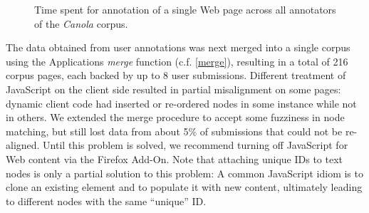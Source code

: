 \begin{figure}[h]
\centering
{}
\caption{
\label{f:userstats}
\label{ens1}
	Time spent for annotation of a single Web page across all annotators of the \textit{Canola} corpus.}
\end{figure}

The data obtained from user annotations was next merged into a single corpus using the Applications \textit{merge} function (c.f. \ref{merge}), resulting in a total of 216 corpus pages, each backed by up to 8 user submissions.
Different treatment of JavaScript on the client side resulted in partial misalignment on some pages:
dynamic client code had inserted or re-ordered nodes in some instance while not in others.
We extended the merge procedure to accept some fuzziness in node matching, but still lost data from about 5\% of submissions that could not be re-aligned.
Until this problem is solved, we recommend turning off JavaScript for Web content via the Firefox Add-On.
Note that attaching unique IDs to text nodes is only a partial solution to this problem:
A common JavaScript idiom is to clone an existing element and to populate it with new content, ultimately leading to different nodes with the same ``unique'' ID. 

